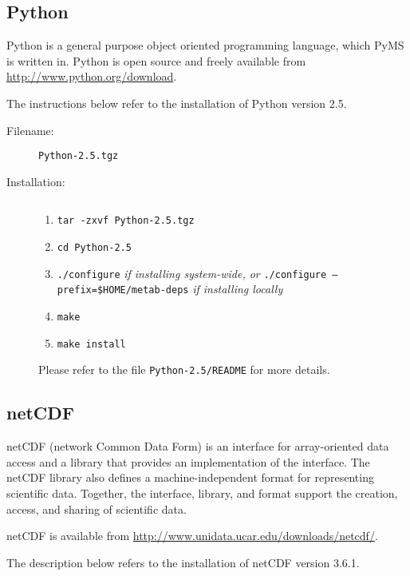 \subsection{Python}

Python is a general purpose object oriented programming language, which
PyMS is written in.  Python is open source and freely available
from \url{http://www.python.org/download}.

The instructions below refer to the installation of Python version
2.5.

\begin{description}
\item [Filename:] {\tt Python-2.5.tgz}
\item [Installation:] $ $
  \begin{enumerate}
  \item {\tt tar -zxvf Python-2.5.tgz}
  \item {\tt cd Python-2.5}
  \item {\tt ./configure} {\it if installing system-wide, or}\newline
        {\tt ./configure --prefix=\$HOME/metab-deps} {\it if installing locally}
  \item {\tt make}
  \item {\tt make install}
  \end{enumerate}
Please refer to the file {\tt Python-2.5/README} for more details.
\end{description}

\subsection{netCDF}

netCDF (network Common Data Form) is an interface for array-oriented
data access and a library that provides an implementation of the
interface. The netCDF library also defines a machine-independent
format for representing scientific data. Together, the interface,
library, and format support the creation, access, and sharing of
scientific data.

netCDF is available from \url{http://www.unidata.ucar.edu/downloads/netcdf/}.

The description below refers to the installation of netCDF version
3.6.1.

